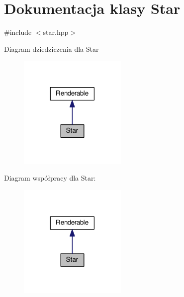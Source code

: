 \hypertarget{class_star}{}\section{Dokumentacja klasy Star}
\label{class_star}


{\ttfamily \#include $<$star.\+hpp$>$}



Diagram dziedziczenia dla Star
\nopagebreak
\begin{figure}[H]
\begin{center}
\leavevmode
\includegraphics[width=146pt]{class_star__inherit__graph}
\end{center}
\end{figure}


Diagram współpracy dla Star\+:
\nopagebreak
\begin{figure}[H]
\begin{center}
\leavevmode
\includegraphics[width=146pt]{class_star__coll__graph}
\end{center}
\end{figure}
